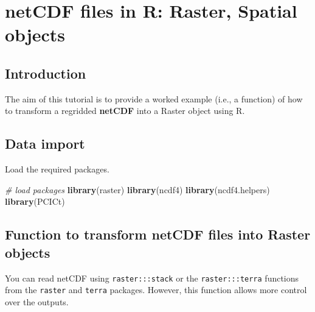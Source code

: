 \documentclass[]{book}
\newenvironment{Shaded}{\begin{snugshade}}{\end{snugshade}}
\newcommand{\CommentTok}[1]{\textcolor[rgb]{0.56,0.35,0.01}{\textit{#1}}}
\newcommand{\KeywordTok}[1]{\textcolor[rgb]{0.13,0.29,0.53}{\textbf{#1}}}
\newcommand{\NormalTok}[1]{#1}
\begin{document}
\hypertarget{netcdf-files-in-r-raster-spatial-objects}{%
\chapter{netCDF files in R: Raster, Spatial objects}\label{netcdf-files-in-r-raster-spatial-objects}}

\hypertarget{introduction}{%
\section{Introduction}\label{introduction}}

The aim of this tutorial is to provide a worked example (i.e., a function) of how to transform a regridded \textbf{netCDF} into a Raster object using R.

\hypertarget{data-import}{%
\section{Data import}\label{data-import}}

Load the required packages.

\begin{Shaded}
\begin{Highlighting}[]
\CommentTok{# load packages}
\KeywordTok{library}\NormalTok{(raster)}
\KeywordTok{library}\NormalTok{(ncdf4)}
\KeywordTok{library}\NormalTok{(ncdf4.helpers)}
\KeywordTok{library}\NormalTok{(PCICt)}
\end{Highlighting}
\end{Shaded}

\hypertarget{function-to-transform-netcdf-files-into-raster-objects}{%
\section{Function to transform netCDF files into Raster objects}\label{function-to-transform-netcdf-files-into-raster-objects}}

You can read netCDF using \texttt{raster:::stack} or the \texttt{raster:::terra} functions from the \texttt{raster} and \texttt{terra} packages. However, this function allows more control over the outputs.
\end{document}
